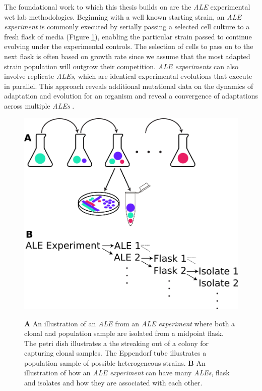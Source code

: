 \documentclass[12pt,final,masters,chapterheads]{ucsd}  %
\begin{document}
%
%

%
%

The foundational work to which this thesis builds on are the \textit{ALE} experimental wet lab methodologies. Beginning with a well known starting strain, an \textit{ALE experiment} is commonly executed by serially passing a selected cell culture to a fresh flask of media (Figure \ref{fig:ale_experiment_samples}), enabling the particular strain passed to continue evolving under the experimental controls. The selection of cells to pass on to the next flask is often based on growth rate since we assume that the most adapted strain population will outgrow their competition. \textit{ALE experiments} can also involve replicate \textit{ALEs}, which are identical experimental evolutions that execute in parallel. This approach reveals additional mutational data on the dynamics of adaptation and evolution for an organism and reveal a convergence of adaptations across multiple \textit{ALEs} \cite{sys_bio_book}.
\begin{figure}[h!]
  \caption{\textbf{A} An illustration of an \textit{ALE} from an \textit{ALE experiment} where both a clonal and population sample are isolated from a midpoint flask. The petri dish illustrates a the streaking out of a colony for capturing clonal samples. The Eppendorf tube illustrates a population sample of possible heterogeneous strains. \textbf{B} An illustration of how an \textit{ALE experiment} can have many \textit{ALEs}, flask and isolates and how they are associated with each other.}
  \centering
  \includegraphics[width=1\textwidth]{ale_experiment_samples.png}
  \label{fig:ale_experiment_samples}
\end{figure}
\end{document}
